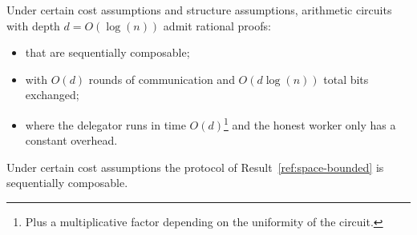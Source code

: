 \begin{result}
	Under certain cost assumptions and structure assumptions, arithmetic circuits with depth $d = O(\log(n))$ admit rational proofs:
	\begin{itemize}
		\item that are sequentially composable;
		\item with $O(d)$ rounds of communication and $O(d \log(n))$ total bits exchanged;
		\item where the delegator runs in time $O(d)$\footnote{Plus a multiplicative factor depending on the uniformity of the circuit.} and the honest worker only has a constant overhead.
	\end{itemize}
\end{result}

\begin{result}
	Under certain cost assumptions the protocol of Result~\ref{ref:space-bounded} is sequentially composable.
\end{result}


\begin{comment}
Our results above assume a "No Free Computation" assumption stating roughly: ``if a machine uses only a fraction $\gamma$ of the resources expected to compute $f(x)$ then it should expect an error probability of at least roughly $1-\gamma$''\footnote{As a rough analogy, one can think about it as if the function $f$ acted as a random oracle and thus can only be brute-forced.}.
Such an assumption is required for multiple delegations as we need some guarantee on the error probability of a ``lazy'' worker.
This assumption has a few limitations: it is specific to a distribution thus not necessarily supporting arbitrary inputs; it may be strongly tied to a specific model of computation (e.g. circuit vs Turing machines); it is an open problem whether it naturally holds for certain classes of problems.
\end{comment}

